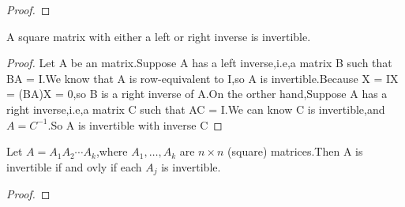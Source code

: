 \begin{proof}

\end{proof}


\begin{corollary}
	A square matrix with either a left or right inverse is invertible.
\end{corollary}

\begin{proof}
 Let A be an  matrix.Suppose A has a left inverse,i.e,a matrix B such that BA = I.We know that A is row-equivalent to I,so A is invertible.Because X = IX = (BA)X = 0,so B is a right inverse of A.On the orther hand,Suppose A has a right inverse,i.e,a matrix C such that AC = I.We can know C is invertible,and $A = C^{-1}$.So A is invertible with inverse C
\end{proof}

\begin{corollary}
	Let $A = A_1A_2\cdots A_k$,where $A_1,\dots,A_k$ are $n \times n$ (square) matrices.Then A is invertible if and ovly if each $A_j$ is invertible.
\end{corollary}

\begin{proof}

\end{proof}



